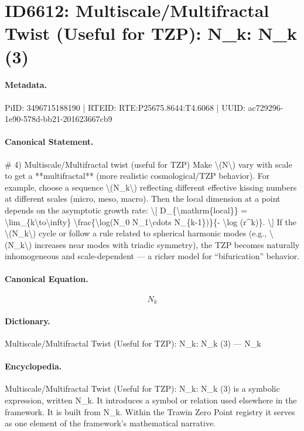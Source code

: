 \section*{ID6612: Multiscale/Multifractal Twist (Useful for TZP): N\_k: N\_k (3)}
\paragraph{Metadata.}
PiID: 3496715188190 | RTEID: RTE:P25675.8644:T4.6068 | UUID: ac729296-1e90-578d-bb21-201623667cb9

\paragraph{Canonical Statement.}
\# 4) Multiscale/Multifractal twist (useful for TZP) Make \textbackslash{}(N\textbackslash{}) vary with scale to get a **multifractal** (more realistic cosmological/TZP behavior). For example, choose a sequence \textbackslash{}(N\_k\textbackslash{}) reflecting different effective kissing numbers at different scales (micro, meso, macro). Then the local dimension at a point depends on the asymptotic growth rate: \textbackslash{}[ D\_\{\textbackslash{}mathrm\{local\}\} = \textbackslash{}lim\_\{k\textbackslash{}to\textbackslash{}infty\} \textbackslash{}frac\{\textbackslash{}log(N\_0 N\_1\textbackslash{}cdots N\_\{k-1\})\}\{- \textbackslash{}log (r\textasciicircum{}k)\}. \textbackslash{}] If the \textbackslash{}(N\_k\textbackslash{}) cycle or follow a rule related to spherical harmonic modes (e.g., \textbackslash{}(N\_k\textbackslash{}) increases near modes with triadic symmetry), the TZP becomes naturally inhomogeneous and scale-dependent — a richer model for “bifurication” behavior.

\paragraph{Canonical Equation.}
\[
N_k
\]

\paragraph{Dictionary.}
Multiscale/Multifractal Twist (Useful for TZP): N\_k: N\_k (3) — N\_k

\paragraph{Encyclopedia.}
Multiscale/Multifractal Twist (Useful for TZP): N\_k: N\_k (3) is a symbolic expression, written N\_k. It introduces a symbol or relation used elsewhere in the framework. It is built from N\_k. Within the Trawin Zero Point registry it serves as one element of the framework's mathematical narrative.

